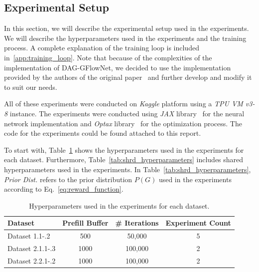 \documentclass{lxaiproposal}
\begin{document}
    \subsection{Experimental Setup}\label{sec:experimental_setup}
    \vspace*{-3mm}

    In this section, we will describe the experimental setup used in the experiments. We will describe the
    hyperparameters used in the experiments and the training process. A complete explanation of the training loop is
    included in~\ref{app:training_loop}. Note that because of the complexities of the implementation of
    DAG-GFlowNet, we decided to use the implementation provided by the authors of the original paper~\cite{deleu2022daggflownet} and further develop and modify it to suit our needs.

    All of these experiments were conducted on \textit{Kaggle} platform using a \textit{TPU VM v3-8} instance. The
    experiments were conducted using \textit{JAX} library~\cite{jax2018github} for the neural network implementation
    and \textit{Optax} library~\cite{deepmind2020jax} for the optimization process. The code for the experiments
    could be found attached to this report.

    To start with, Table~\ref{tab:db_hyperparameters} shows the hyperparameters used in the experiments for each
    dataset. Furthermore, Table~\ref{tab:shrd_hyperparameters} includes shared hyperparameters used in the
    experiments. In Table~\ref{tab:shrd_hyperparameters}, \textit{Prior Dist.} refers to the prior distribution
    $P(G)$ used in the experiments according to Eq.~\eqref{eq:reward_function}.

    \begin{table}[h]
        \centering
        \begin{tabular}{|l|c|c|c|}
            \hline
            \textbf{Dataset} & \textbf{Prefill Buffer} & \textbf{\# Iterations} & \textbf{Experiment Count} \\
            \hline
            Dataset 1.1-.2   & 500                     & 50,000                 & 5                         \\
            Dataset 2.1.1-.3 & 1000                    & 100,000                & 2                         \\
            Dataset 2.2.1-.2 & 1000                    & 100,000                & 2                         \\
            \hline
        \end{tabular}
        \caption{Hyperparameters used in the experiments for each dataset.}
        \label{tab:db_hyperparameters}
    \end{table}
\end{document}

